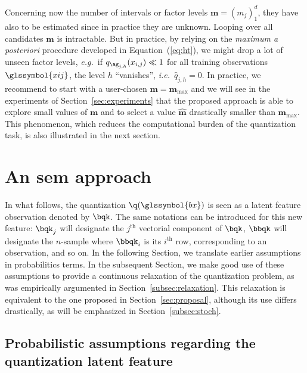 Concerning now the number of intervals or factor levels $\boldsymbol{m} = (m_j)_1^d$, they have also to be estimated since in practice they are unknown. Looping over all candidates $\boldsymbol{m}$ is intractable. But in practice, by relying on the \textit{maximum a posteriori} procedure developed in Equation~(\ref{eq:ht}), we might drop a lot of unseen factor levels, \textit{e.g.}\ if $q_{\ag_{j,h}}(x_{i,j}) \ll 1$ for all training observations $\glssymbol{xij}$, the level $h$ ``vanishes'', \textit{i.e.}\ $\hat{q}_{j,h} = 0$. In practice, we recommend to start with a user-chosen $\bm{m}=\boldsymbol{m}_{\max}$ and we will see in the experiments of Section~\ref{sec:experiments} that the proposed approach is able to explore small values of $\boldsymbol{m}$ and to select a value $\hat{\boldsymbol{m}}$ drastically smaller than $\boldsymbol{m}_{\max}$. This phenomenon, which reduces the computational burden of the quantization task, is also illustrated in the next section.




\section{An \gls{sem} approach} \label{sec:sem}
 
 
In what follows, the quantization $\q(\glssymbol{bx})$ is seen as a latent feature observation denoted by $\bqk$. The same notations can be introduced for this new feature: $\bqk_j$ will designate the $j^{\text{th}}$ vectorial component of $\bqk$, $\bbqk$ will designate the $n$-sample where $\bbqk_i$ is its $i^{\text{th}}$ row, corresponding to an observation, and so on. In the following Section, we translate earlier assumptions in probabilitics terms. In the subsequent Section, we make good use of these assumptions to provide a continuous relaxation of the quantization problem, as was empirically argumented in Section~\ref{subsec:relaxation}. This relaxation is equivalent to the one proposed in Section~\ref{sec:proposal}, although its use differs drastically, as will be emphasized in Section~\ref{subsec:stoch}.

\subsection{Probabilistic assumptions regarding the quantization latent feature}

